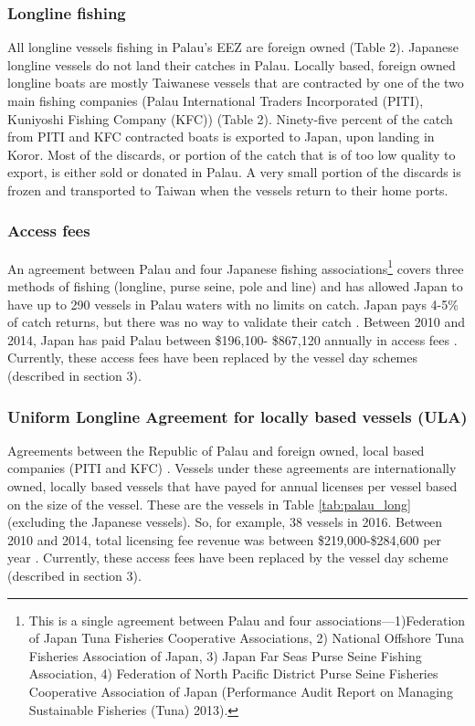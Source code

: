 \documentclass[11pt,english]{article}
\begin{document}
\subsubsection{Longline fishing}

All longline vessels fishing in Palau’s EEZ are foreign owned (Table 2). Japanese longline vessels do not land their catches in Palau. Locally based, foreign owned longline boats are mostly Taiwanese vessels that are contracted by one of the two main fishing companies (Palau International Traders Incorporated (PITI), Kuniyoshi Fishing Company (KFC)) (Table 2). Ninety-five percent of the catch from PITI and KFC contracted boats is exported to Japan, upon landing in Koror. Most of the discards, or portion of the catch that is of too low quality to export, is either sold or donated in Palau. A very small portion of the discards is frozen and transported to Taiwan when the vessels return to their home ports.

%


\subsubsection{Access fees}

An agreement between Palau and four Japanese fishing associations\footnote{This is a single agreement between Palau and four associations—1)Federation of Japan Tuna Fisheries Cooperative Associations, 2) National Offshore Tuna Fisheries Association of Japan, 3) Japan Far Seas Purse Seine Fishing Association, 4) Federation of North Pacific District Purse Seine Fisheries Cooperative Association of Japan (Performance Audit Report on Managing Sustainable Fisheries (Tuna) 2013).} covers three methods of fishing (longline, purse seine, pole and line) and has allowed Japan to have up to 290 vessels in Palau waters with no limits on catch. Japan pays 4-5\% of catch returns, but there was no way to validate their catch \citep{Tewid2013}. Between 2010 and 2014, Japan has paid Palau between \$196,100- \$867,120 annually in access fees \citep{Gillett2016}. Currently, these access fees have been replaced by the vessel day schemes (described in section 3).

\subsubsection{Uniform Longline Agreement for locally based vessels (ULA)}
 
Agreements between the Republic of Palau and foreign owned, local based companies (PITI and KFC) \citep{Tewid2013}. Vessels under these agreements are internationally owned, locally based vessels that have payed for annual licenses per vessel based on the size of the vessel. These are the vessels in Table \ref{tab:palau_long} (excluding the Japanese vessels). So, for example, 38 vessels in 2016. Between 2010 and 2014, total licensing fee revenue was between \$219,000-\$284,600 per year \citep{Gillett2016}. Currently, these access fees have been replaced by the vessel day scheme (described in section 3).
\end{document}
